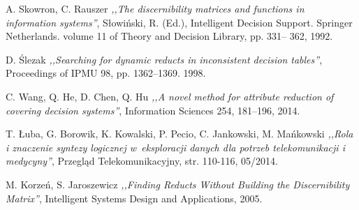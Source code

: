 \begin{thebibliography}{99}
 A. Skowron, C. Rauszer \emph{,,The discernibility matrices and functions in information systems''}, Słowiński, R. (Ed.), Intelligent Decision Support. Springer Netherlands. volume 11 of Theory and Decision Library, pp. 331– 362, 1992.

 D. Ślezak \emph{,,Searching for dynamic reducts in inconsistent decision tables''}, Proceedings of IPMU 98, pp. 1362–1369. 1998.

 C. Wang, Q. He, D. Chen, Q. Hu \emph{,,A novel method for attribute reduction of covering decision systems''}, Information Sciences 254, 181–196, 2014.

 T. Łuba, G. Borowik, K. Kowalski, P. Pecio, C. Jankowski, M. Mańkowski \emph{,,Rola i znaczenie syntezy logicznej w~eksploracji danych dla potrzeb telekomunikacji i medycyny''}, Przegląd Telekomunikacyjny, str. 110-116, 05/2014.

 M. Korzeń, S. Jaroszewicz \emph{,,Finding Reducts Without Building the Discernibility Matrix''}, Intelligent Systems Design and Applications, 2005.

\end{thebibliography}
\clearpage




